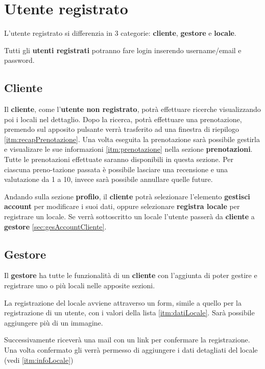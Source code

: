 \section{Utente registrato}
L'utente registrato si differenzia in 3 categorie:  \textbf{cliente}, \textbf{gestore} e \textbf{locale}.

Tutti gli \textbf{utenti registrati} potranno fare login inserendo username/email e password.

\subsection{Cliente}

Il \textbf{cliente}, come l'\textbf{utente non registrato}, potrà effettuare ricerche visualizzando poi
i locali nel dettaglio.
Dopo la ricerca, potrà effettuare una prenotazione, premendo sul apposito pulsante verrà trasferito ad una finestra
di riepilogo \ref{itm:recapPrenotazione}. 
Una volta eseguita la prenotazione sarà possibile gestirla e visualizare le sue informazioni \ref{itm:prenotazione} 
nella sezione \textbf{prenotazioni}. Tutte le prenotazioni effettuate saranno disponibili in questa sezione. Per 
ciascuna preno-tazione passata è possibile lasciare una recensione e una valutazione da 1 a 10, invece sarà possibile
annullare quelle future. 

Andando sulla sezione \textbf{profilo}, il \textbf{cliente} potrà selezionare l'elemento \textbf{gestisci 
account} per modificare i suoi dati, oppure selezionare \textbf{registra locale} per registrare un locale. Se verrà
sottoscritto un locale l'utente passerà da \textbf{cliente} a \textbf{gestore}
\ref{sec:gesAccountCliente}. 

\subsection{Gestore}
Il \textbf{gestore} ha tutte le funzionalità di un \textbf{cliente} con l'aggiunta di poter gestire e registrare 
uno o più locali nelle apposite sezioni.

La registrazione del locale avviene attraverso un form, simile a quello per la registrazione di un utente, con i 
valori della lista \ref{itm:datiLocale}. Sarà possibile aggiungere più di un immagine.

Successivamente riceverà una mail con un link per confermare la registrazione. Una volta confermato gli verrà 
permesso di aggiungere i dati detagliati del locale (vedi \ref{itm:infoLocale})

